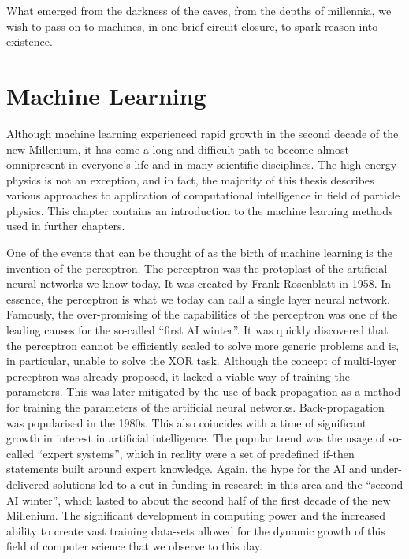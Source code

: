 \begin{savequote}[75mm]
What emerged from the darkness of the caves, from the depths of millennia, we wish to pass on to machines, in one brief circuit closure, to spark reason into existence.
\end{savequote}


\chapter{Machine Learning }
\label{chap:ml}

Although machine learning experienced rapid growth in the second decade of the new Millenium, it has come a long and difficult path to become almost omnipresent in everyone's life and in many scientific disciplines.
The high energy physics is not an exception, and in fact, the majority of this thesis describes various approaches to application of computational intelligence in field of particle physics.
This chapter contains an introduction to the machine learning methods used in further chapters.

One of the events that can be thought of as the birth of machine learning is the invention of the perceptron.
The perceptron was the protoplast of the artificial neural networks we know today. It was created by Frank Rosenblatt \cite{Rosenblatt1958ThePA} in 1958.
In essence, the perceptron is what we today can call a single layer neural network.
Famously, the over-promising of the capabilities of the perceptron was one of the leading causes for the so-called ``first AI winter''\cite{enwiki:1076647189}.
It was quickly discovered that the perceptron cannot be efficiently scaled to solve more generic problems and is, in particular, unable to solve the XOR task.
Although the concept of multi-layer perceptron was already proposed, it lacked a viable way of training the parameters.
This was later mitigated by the use of back-propagation as a method for training the parameters of the artificial neural networks.
Back-propagation was popularised in the 1980s. This also coincides with a time of significant growth in interest in artificial intelligence.
The popular trend was the usage of so-called ``expert systems'', which in reality were a set of predefined if-then statements built around expert knowledge.
Again, the hype for the AI and under-delivered solutions led to a cut in funding in research in this area and the ``second AI winter'', which lasted to about the second half of the first decade of the new Millenium.
The significant development in computing power and the increased ability to create vast training data-sets allowed for the dynamic growth of this field of computer science that we observe to this day.

